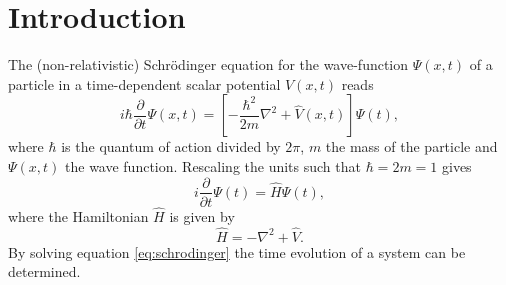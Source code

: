 \section{Introduction}
The (non-relativistic) Schr\"{o}dinger equation for the wave-function $\Psi(x,t)$ of a particle in a time-dependent scalar potential $V(x,t)$ reads 
\[
i\hbar \frac{\partial}{\partial t}\Psi(x,t) = \left[-\frac{\hbar^2}{2m}\nabla^2+\hat{V}(x,t)\right]\Psi(t),
\]
where $\hbar$ is the quantum of action divided by $2\pi$, $m$ the mass of the particle and $\Psi(x,t)$ the wave function.
Rescaling the units such that $\hbar = 2m = 1$ gives
\begin{equation}\label{eq:schrodinger}
i \frac{\partial}{\partial t}\Psi(t) = \hat{H}\Psi(t),
\end{equation}where the Hamiltonian $\hat{H}$ is given by
\[
\hat{H} = -\nabla^2+\hat{V}.
\] By solving equation \ref{eq:schrodinger} the time evolution of a system can be determined.
